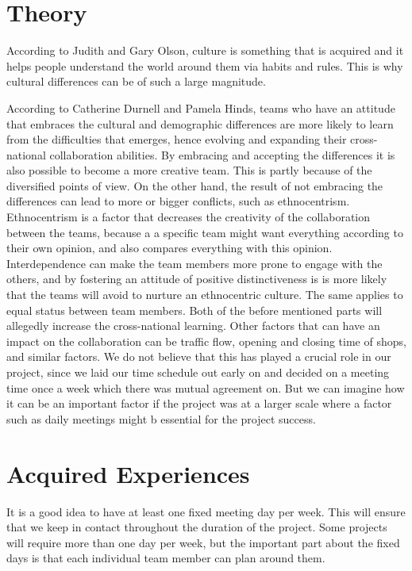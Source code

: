 \section{Theory}

According to Judith and Gary Olson\cite{JGO}, culture is something that is acquired and it helps people understand the world around them via habits and rules. This is why cultural differences can be of such a large magnitude.
 
According to Catherine Durnell and Pamela Hinds\cite{CH}, teams who have an attitude that embraces the cultural and demographic differences are more likely to learn from the difficulties that emerges, hence evolving and expanding their cross-national collaboration abilities. By embracing and accepting the differences it is also possible to become a more creative team. This is partly because of the diversified points of view. On the other hand, the result of not embracing the differences can lead to more or bigger conflicts, such as ethnocentrism. Ethnocentrism is a factor that decreases the creativity of the collaboration between the teams, because a a specific team might want everything according to their own opinion, and also compares everything with this opinion.
Interdependence can make the team members more prone to engage with the others, and by fostering an attitude of positive distinctiveness is is more likely that the teams will avoid to nurture an ethnocentric culture. The same applies to equal status between team members. Both of the before mentioned parts will allegedly increase the cross-national learning.
Other factors that can have an impact on the collaboration can be traffic flow, opening and closing time of shops, and similar factors. We do not believe that this has played a crucial role in our project, since we laid our time schedule out early on and decided on a meeting time once a week which there was mutual agreement on. But we can imagine how it can be an important factor if the project was at a larger scale where a factor such as daily meetings might b essential for the project success.


\section{Acquired Experiences}


It is a good idea to have at least one fixed meeting day per week. This will ensure that we keep in contact throughout the duration of the project. Some projects will require more than one day per week, but the important part about the fixed days is that each individual team member can plan around them.

